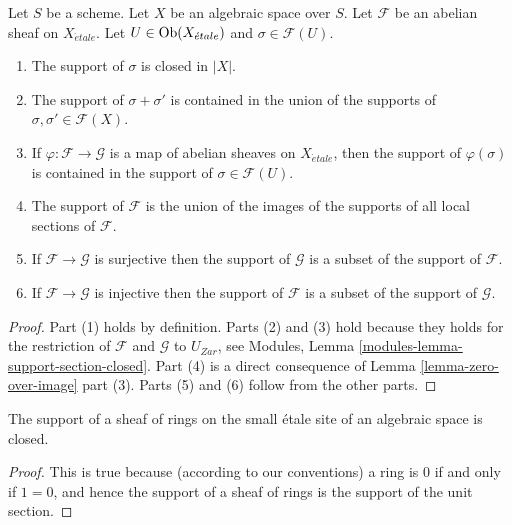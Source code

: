 \begin{lemma}
\label{lemma-support-section-closed}
Let $S$ be a scheme.
Let $X$ be an algebraic space over $S$.
Let $\mathcal{F}$ be an abelian sheaf on $X_{\acute{e}tale}$.
Let $U \in \mathop{\rm Ob}\nolimits(X_{\acute{e}tale})$ and $\sigma \in \mathcal{F}(U)$.
\begin{enumerate}
\item The support of $\sigma$ is closed in $|X|$.
\item The support of $\sigma + \sigma'$ is contained in the union of
the supports of $\sigma, \sigma' \in \mathcal{F}(X)$.
\item If $\varphi : \mathcal{F} \to \mathcal{G}$ is a map of
abelian sheaves on $X_{\acute{e}tale}$, then the support of $\varphi(\sigma)$ is
contained in the support of $\sigma \in \mathcal{F}(U)$.
\item The support of $\mathcal{F}$ is the union of the images of the
supports of all local sections of $\mathcal{F}$.
\item If $\mathcal{F} \to \mathcal{G}$ is surjective then the support
of $\mathcal{G}$ is a subset of the support of $\mathcal{F}$.
\item If $\mathcal{F} \to \mathcal{G}$ is injective then the support
of $\mathcal{F}$ is a subset of the support of $\mathcal{G}$.
\end{enumerate}
\end{lemma}

\begin{proof}
Part (1) holds by definition.
Parts (2) and (3) hold because they holds for the restriction of
$\mathcal{F}$ and $\mathcal{G}$ to $U_{Zar}$, see
Modules, Lemma \ref{modules-lemma-support-section-closed}.
Part (4) is a direct consequence of
Lemma \ref{lemma-zero-over-image} part (3).
Parts (5) and (6) follow from the other parts.
\end{proof}

\begin{lemma}
\label{lemma-support-sheaf-rings-closed}
The support of a sheaf of rings on the small \'etale site of an
algebraic space is closed.
\end{lemma}

\begin{proof}
This is true because (according to our conventions)
a ring is $0$ if and only if
$1 = 0$, and hence the support of a sheaf of rings
is the support of the unit section.
\end{proof}






